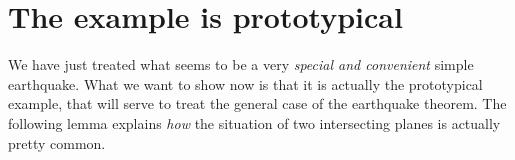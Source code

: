 
\section{The example is prototypical} We have just treated what seems to be a very \textit{special and convenient} simple earthquake. What we want to show now is that it is actually the prototypical example, that will serve to treat the general case of the earthquake theorem. The following lemma explains \textit{how} the situation of two intersecting planes is actually pretty common. 

